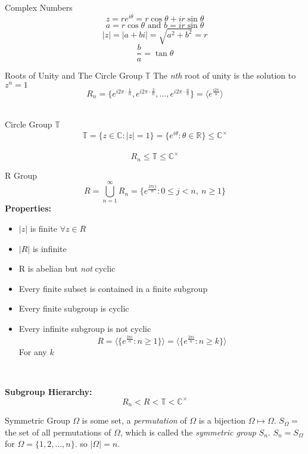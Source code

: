 \documentclass{article}
\begin{document}
\begin{multicols*}{3}
\begin{blackbox}{Complex Numbers}
    \[z = re^{i\theta} = r\cos\theta + ir\sin\theta\]
    \[a = r\cos\theta \text{ and } b = ir\sin\theta\]
    $$|z| = |a+bi| = \sqrt{a^2 + b^2} = r$$
    \[\frac{b}{a} = \tan\theta\]
\end{blackbox}
\begin{blackbox}{Roots of Unity and The Circle Group $\mathbb{T}$}
The \emph{nth} root of unity is the solution to $z^n = 1$\\[-1ex]
\[R_n = \{e^{i2\pi\cdot\frac{1}{n}}, e^{i2\pi\cdot\frac{2}{n}}, \ldots, e^{i2\pi\cdot\frac{n}{n}}\} = \langle e^{\frac{i2\pi}{n}} \rangle\]\\[-2ex]
\begin{bluebox}{Circle Group $\mathbb{T}$}
    \[\mathbb{T} = \{z \in \mathbb{C}: |z| = 1\} = \{e^{i\theta}: \theta \in \mathbb{R}\} \leq \mathbb{C}^\times\]\\[-7ex]
    \[R_n \leq \mathbb{T} \leq \mathbb{C}^\times\]
\end{bluebox}
\begin{pinkbox}{R Group}
    \[R = \bigcup_{n=1}^\infty R_n = \{e^{\frac{2\pi ij}{n}}: 0 \leq j <n, \ n \geq 1\}\]
    \textbf{Properties:}
    \begin{itemize}
        \item $|z|$ is finite $\forall z \in R$
        \item $|R|$ is infinite
        \item R is abelian but \emph{not} cyclic
        \item Every finite subset is contained in a finite subgroup
        \item Every finite subgroup is cyclic
        \item Every infinite subgroup is not cyclic
        \[R = \langle \{e^{\frac{2\pi i}{n}}: n \geq 1\} \rangle = \langle \{e^{\frac{2\pi i}{n}}: n \geq k\} \rangle\]
        For any $k$
    \end{itemize}
\end{pinkbox}\\[-4ex]
\begin{center}
    \textbf{Subgroup Hierarchy:}
\[R_n < R < \mathbb{T} < \mathbb{C^\times}\]
\end{center}
\end{blackbox}
\begin{blackbox}{Symmetric Group}
$\Omega$ is some set, a \emph{permutation} of $\Omega$ is a bijection $\Omega \mapsto \Omega$. $S_{\Omega} = $ the set of all permutations of $\Omega$, which is called the \emph{symmetric group} $S_n$. $S_n = S_{\Omega}$ for $\Omega = \{1,2,\ldots, n\}$. so $|\Omega| = n$.\\

\end{blackbox}
\end{multicols*}
\end{document}
